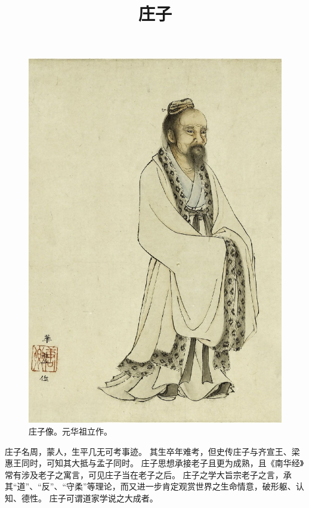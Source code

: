\documentclass[11pt]{article}
\title{庄子}
\date{}
\begin{document}
  \maketitle

  \begin{figure}
    \centering
    \includegraphics[height=0.7\textwidth]{../Figures/ZhuangZi.jpg}
    \caption{庄子像。元华祖立作。}
  \end{figure}
  
  \newpage

  \linenumbers

庄子名周，蒙人，生平几无可考事迹。
其生卒年难考，但史传庄子与齐宣王、梁惠王同时，可知其大抵与孟子同时。
庄子思想承接老子且更为成熟，且《南华经》常有涉及老子之寓言，可见庄子当在老子之后。
庄子之学大旨宗老子之言，承其“道”、“反”、“守柔”等理论，而又进一步肯定观赏世界之生命情意，破形躯、认知、德性。
庄子可谓道家学说之大成者。
\end{document}
